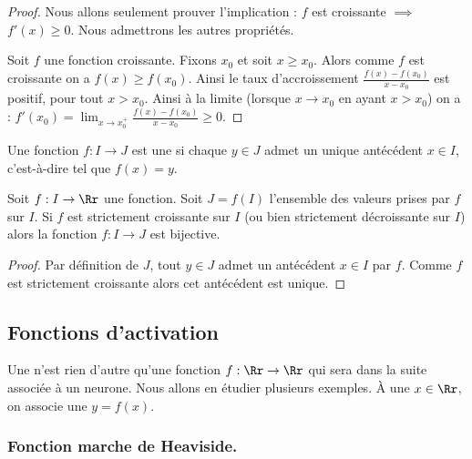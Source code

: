 \documentclass[11pt,class=report,crop=false]{standalone}
\begin{document}
\begin{proof}
Nous allons seulement prouver l'implication : $f$ est croissante $\implies$ $f'(x)\ge0$. Nous admettrons les autres propriétés.

Soit $f$ une fonction croissante. Fixons $x_0$ et soit $x\ge x_0$. Alors comme $f$ est croissante on a $f(x) \ge f(x_0)$. Ainsi le taux d'accroissement $\frac{f(x)-f(x_0)}{x-x_0}$ est positif, pour tout $x>x_0$. Ainsi à la limite (lorsque $x\to x_0$ en ayant $x>x_0$) on a : $f'(x_0) = \lim_{x \to x_0^+}\frac{f(x)-f(x_0)}{x-x_0} \ge 0$.
 
\end{proof}


\begin{definition}
Une fonction $f : I \to J$ est une  si chaque $y \in J$ admet un unique antécédent $x \in I$, c'est-à-dire tel que $f(x)=y$.
\end{definition}

\begin{proposition}
Soit $f : I \to \Rr$ une fonction. Soit $J = f(I)$ l'ensemble des valeurs prises par $f$ sur $I$. Si $f$ est strictement croissante sur $I$ (ou bien strictement décroissante sur $I$) alors la fonction $f : I \to J$ est bijective.
\end{proposition}

\begin{proof}
Par définition de $J$, tout $y\in J$ admet un antécédent $x\in I$ par $f$. Comme $f$ est strictement croissante alors cet antécédent est unique.
\end{proof}


\subsection{Fonctions d'activation}


Une  n'est rien d'autre qu'une fonction $f : \Rr \to \Rr$ qui sera dans la suite associée à un neurone. Nous allons en étudier plusieurs exemples. À une  $x \in \Rr$, on associe une  $y = f(x)$.

\subsubsection{Fonction marche de Heaviside.}
\end{document}
